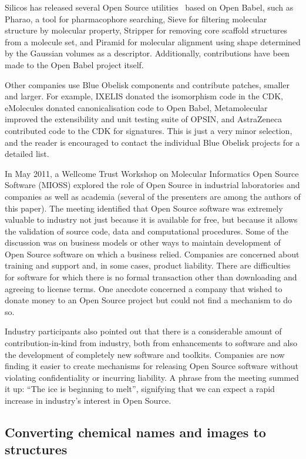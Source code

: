 \documentclass[10pt]{bmc_article}
\newenvironment{bmcformat}{\begin{raggedright}\baselineskip20pt\sloppy\setboolean{publ}{false}}{\end{raggedright}\baselineskip20pt\sloppy}
\begin{document}
\begin{bmcformat}
Silicos has released several Open Source utilities~\cite{SilicosDownloads} based on
Open Babel, such as Pharao, a tool for pharmacophore searching,
Sieve for filtering molecular structure by molecular property,
Stripper for removing core scaffold structures from a molecule
set, and Piramid for molecular alignment using shape determined
by the Gaussian volumes as a descriptor. Additionally,
contributions have been made to the Open Babel project itself.

Other companies use Blue Obelisk components and contribute patches,
smaller and larger. For example, IXELIS donated the isomorphism
code in the CDK, eMolecules donated canonicalisation code to
Open Babel, Metamolecular improved the extensibility and unit testing suite of OPSIN,
and AstraZeneca contributed code to the CDK for
signatures. This is just a very minor selection, and the reader
is encouraged to contact the individual Blue Obelisk projects
for a detailed list.

In May 2011, a Wellcome Trust Workshop on
Molecular Informatics Open Source Software (MIOSS) explored the role of
Open Source in industrial laboratories and companies as well as
academia (several of
the presenters are among the authors of this paper).
The meeting identified that Open Source software was extremely valuable to
industry not just because it is available for free,
but because it allows the validation of source code, data and
computational procedures. Some 
of the discussion was on business models or other ways to maintain 
development of Open Source software on which a business relied.
Companies are concerned about training and support
and, in some cases, product liability.  There are difficulties
for software for which there is no formal
transaction other than downloading and agreeing to license terms.
One anecdote concerned a company
that wished to donate money to an Open Source
project but could not find a mechanism to do so.

Industry participants also pointed out that 
there is a considerable amount of
contribution-in-kind from industry, both from
enhancements to software and also the development of completely new
software and toolkits. Companies are now finding it easier to create
mechanisms for releasing Open Source software
without violating confidentiality or incurring liability.
A phrase from the meeting
summed it up: ``The ice is beginning to melt'', signifying that we can
expect a rapid increase in industry's interest
in Open Source.

\subsection*{Converting chemical names and images to structures}


\end{bmcformat}
\end{document}
